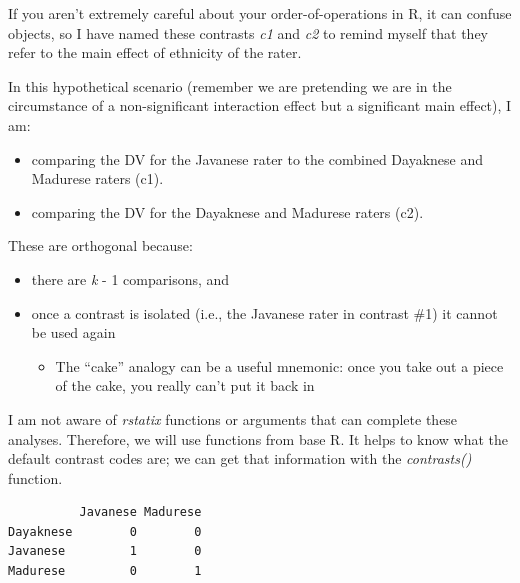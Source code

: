 \documentclass[
  11pt,
]{book}
\newenvironment{Shaded}{\begin{snugshade}}{\end{snugshade}}
\newcommand{\FunctionTok}[1]{\textcolor[rgb]{0.27,0.27,0.27}{\textbf{#1}}}
\newcommand{\NormalTok}[1]{#1}
\newcommand{\SpecialCharTok}[1]{\textcolor[rgb]{0.43,0.43,0.43}{\textbf{#1}}}
\providecommand{\tightlist}{%
  \setlength{\itemsep}{0pt}\setlength{\parskip}{0pt}}
\begin{document}
If you aren't extremely careful about your order-of-operations in R, it can confuse objects, so I have named these contrasts \emph{c1} and \emph{c2} to remind myself that they refer to the main effect of ethnicity of the rater.

In this hypothetical scenario (remember we are pretending we are in the circumstance of a non-significant interaction effect but a significant main effect), I am:

\begin{itemize}
\tightlist
\item
  comparing the DV for the Javanese rater to the combined Dayaknese and Madurese raters (c1).
\item
  comparing the DV for the Dayaknese and Madurese raters (c2).
\end{itemize}

These are orthogonal because:

\begin{itemize}
\tightlist
\item
  there are \emph{k} - 1 comparisons, and
\item
  once a contrast is isolated (i.e., the Javanese rater in contrast \#1) it cannot be used again

  \begin{itemize}
  \tightlist
  \item
    The ``cake'' analogy can be a useful mnemonic: once you take out a piece of the cake, you really can't put it back in
  \end{itemize}
\end{itemize}

I am not aware of \emph{rstatix} functions or arguments that can complete these analyses. Therefore, we will use functions from base R. It helps to know what the default contrast codes are; we can get that information with the \emph{contrasts()} function.

\begin{Shaded}
\end{Shaded}

\begin{verbatim}
          Javanese Madurese
Dayaknese        0        0
Javanese         1        0
Madurese         0        1
\end{verbatim}
\end{document}
